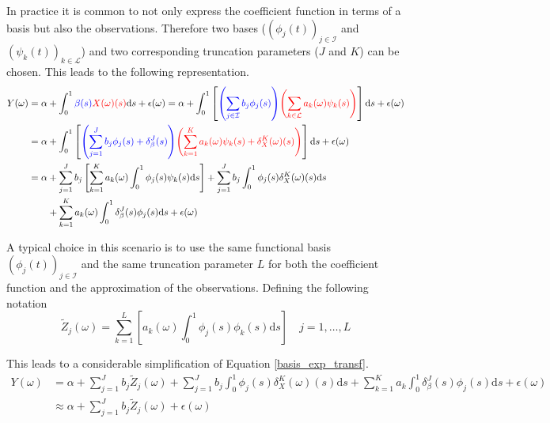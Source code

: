 \documentclass[11pt,twoside,a4paper]{article}
\begin{document}
	In practice it is common to not only express the coefficient function in terms of a basis but also the observations. Therefore two bases ($\left(\phi_j(t)\right)_{j \in \mathcal{I}}$ and $\left(\psi_k(t)\right)_{k \in \mathcal{L}}$) and two corresponding truncation parameters ($J$ and $K$) can be chosen. This leads to the following representation.
	\begin{equation}
		\begin{split}
			Y(\omega) & = \alpha + \int_{0}^{1} {\color{blue}\beta(s)} {\color{red}X(\omega)(s)}\mathrm{d}s + \epsilon(\omega)
			 = \alpha + \int_{0}^{1}\left[{\color{blue}\left(\sum_{j \in \mathcal{I}} b_j  \phi_j(s)\right)} {\color{red}\left(\sum_{k \in \mathcal{L}} a_k(\omega)  \psi_k(s)\right)} \right]\mathrm{d}s + \epsilon(\omega) \\
			& = \alpha + \int_{0}^{1}\left[{\color{blue}\left(\sum_{j = 1}^{J} b_j  \phi_j(s) + \delta_{\beta}^{J}(s)\right)} {\color{red}\left(\sum_{k = 1}^K a_k(\omega)  \psi_k(s) + \delta_{X}^{K}(\omega)(s)\right)} \right]\mathrm{d}s + \epsilon(\omega)\\
			& = \alpha + \sum_{j = 1}^J b_j \left[\sum_{k = 1}^K a_k(\omega) \int_{0}^{1} \phi_j(s) \psi_k(s) \mathrm{d}s\right] + \sum_{j = 1}^{J} b_j  \int_{0}^{1} \phi_j(s) \delta_{X}^{K}(\omega)(s) \mathrm{d}s\\
			& \quad \quad + \sum_{k = 1}^{K} a_k(\omega)  \int_{0}^{1} \delta_{\beta}^{J}(s)\phi_j(s) \mathrm{d}s + \epsilon(\omega)
		\end{split}
	\end{equation}

	A typical choice in this scenario is to use the same functional basis $\left(\phi_j(t)\right)_{j \in \mathcal{I}}$ and the same truncation parameter $L$ for both the coefficient function and the approximation of the observations. Defining the following notation 
	\begin{equation}
			\tilde{Z}_j(\omega) = \sum_{k = 1}^{L} \left[a_k(\omega) \int_{0}^{1} \phi_j(s) \phi_k(s) \mathrm{d}s \right] \quad j = 1, \dots, L
	\end{equation}

	This leads to a considerable simplification of Equation \ref{basis_exp_transf}.
	\begin{equation}\label{simplified_model_basis_equation}
		\begin{split}
			Y(\omega) &= \alpha + \sum_{j = 1}^{J} b_j \tilde{Z}_j(\omega) + \sum_{j = 1}^{J} b_j  \int_{0}^{1} \phi_j(s) \delta_{X}^{K}(\omega)(s) \mathrm{d}s + \sum_{k = 1}^{K} a_k  \int_{0}^{1} \delta_{\beta}^{J}(s)\phi_j(s) \mathrm{d}s + \epsilon(\omega) \\
			& \approx \alpha + \sum_{j = 1}^{J} b_j \tilde{Z}_j(\omega) + \epsilon(\omega)
		\end{split}
	\end{equation}
\end{document}
